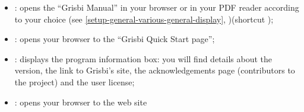 \vspace{3mm}
\noindent
\begin{minipage}{.7\linewidth}
	\begin{itemize}[rightmargin=.6cm]
		\item {}: opens the \enquote{Grisbi Manual} in your browser or in your \gls{PDF} reader according to your choice (see \vref{setup-general-various-general-display}, )(shortcut ); 
		\item {}: opens your browser to the \enquote{Grisbi Quick Start page};
		\item {}: displays the program information box: you will find details about the version, the link to Grisbi's site, the acknowledgements page (contributors to the project) and the user license;
		\item {}: opens your browser to the \footnotemark web site
	\end{itemize}
\end{minipage}
\hspace{10pt}	
